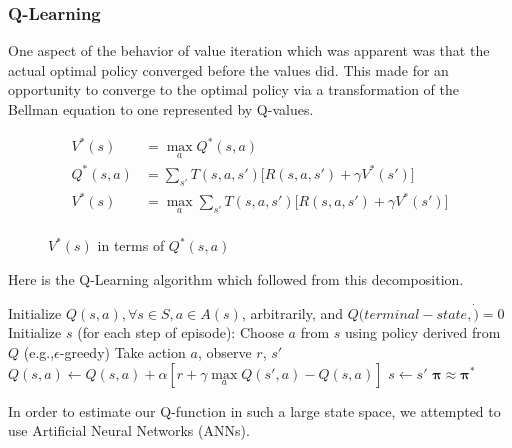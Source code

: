\documentclass[letterpaper]{article}
\begin{document}
\subsubsection{Q-Learning}
One aspect of the behavior of value iteration which was apparent was that the actual optimal policy converged before the values did.  This made for an 
opportunity to converge to the optimal policy via a transformation of the Bellman equation to one represented by Q-values.
\begin{figure}[H]
\centering
\begin{align*}
	V^*(s) &= \max\limits_{a}Q^*(s,a) \\
	Q^*(s,a) &= \sum\limits_{s'}T(s,a,s')\big[R(s,a,s') + \gamma V^*(s')\big] \\
	V^*(s) &= \max\limits_{a}\sum\limits_{s'}T(s,a,s')\big[R(s,a,s') + \gamma V^*(s')\big] \\
\end{align*}
\caption{$V^*(s)$ in terms of $Q^*(s, a)$}
\end{figure}
Here is the Q-Learning algorithm which followed from this decomposition.
\begin{algorithmic}[1]
\State Initialize $Q(s, a), \forall s \in S, a \in A(s)$, arbitrarily, and $Q(terminal-state, \dot) = 0$
\State Initialize $s$
\Repeat (for each step of episode):
\State \scriptsize Choose $a$ from $s$ using policy derived from $Q$ (e.g.,$\epsilon$-greedy)\normalsize
\State Take action $a$, observe $r$, $s'$
\State \scriptsize$Q(s, a) \gets Q(s, a) + \alpha[r + \gamma \max\limits_{a} Q(s', a) - Q(s,a)]$\normalsize
\State $s \gets s'$
\EndFor
\Return $\boldsymbol{\pi} \approx \boldsymbol{\pi}^*$
\EndProcedure
\end{algorithmic}
In order to estimate our Q-function in such a large state space, we attempted to use Artificial Neural Networks (ANNs).
\end{document}
